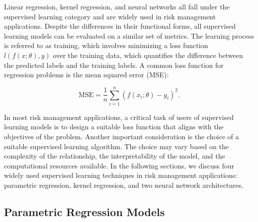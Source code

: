 Linear regression, kernel regression, and neural networks all fall under the supervised learning category and are widely used in risk management applications.
Despite the differences in their functional forms, all supervised learning models can be evaluated on a similar set of metrics.
The learning process is referred to as training, which involves minimizing a loss function $l(f(x; \theta),y)$ over the training data, which quantifies the difference between the predicted labels and the training labels.
A common loss function for regression problems is the mean squared error (MSE):

\begin{equation} \label{eq:mse}
    \text{MSE} = \frac{1}{n} \sum_{i=1}^{n} (f(x_i;\theta) - y_i)^2.
\end{equation}

In most risk management applications, a critical task of users of supervised learning models is to design a suitable loss function that aligns with the objectives of the problem.
Another important consideration is the choice of a suitable supervised learning algorithm.
The choice may vary based on the complexity of the relationship, the interpretability of the model, and the computational resources available.
In the following sections, we discuss four widely used supervised learning techniques in risk management applications: parametric regression, kernel regression, and two neural network architectures.

\subsection{Parametric Regression Models}

